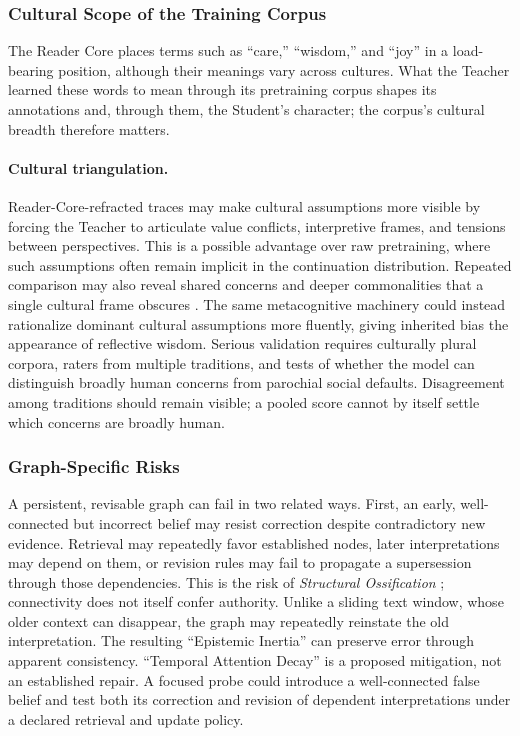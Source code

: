 \documentclass[11pt]{article}
\begin{document}
\subsubsection{Cultural Scope of the Training Corpus}\label{sec:weird-wisdom}

The Reader Core places terms such as ``care,'' ``wisdom,'' and ``joy'' in a load-bearing position, although their meanings vary across cultures. What the Teacher learned these words to mean through its pretraining corpus shapes its annotations and, through them, the Student's character; the corpus's cultural breadth therefore matters.

\paragraph{Cultural triangulation.} Reader-Core-refracted traces may make cultural assumptions more visible by forcing the Teacher to articulate value conflicts, interpretive frames, and tensions between perspectives. This is a possible advantage over raw pretraining, where such assumptions often remain implicit in the continuation distribution. Repeated comparison may also reveal shared concerns and deeper commonalities that a single cultural frame obscures \cite{westerberg2025superintelligence}. The same metacognitive machinery could instead rationalize dominant cultural assumptions more fluently, giving inherited bias the appearance of reflective wisdom. Serious validation requires culturally plural corpora, raters from multiple traditions, and tests of whether the model can distinguish broadly human concerns from parochial social defaults. Disagreement among traditions should remain visible; a pooled score cannot by itself settle which concerns are broadly human.

\subsubsection{Graph-Specific Risks}\label{sec:graph-risks}

A persistent, revisable graph can fail in two related ways. First, an early,
well-connected but incorrect belief may resist correction despite contradictory
new evidence. Retrieval may repeatedly favor established nodes, later
interpretations may depend on them, or revision rules may fail to propagate a
supersession through those dependencies. This is the risk of \emph{Structural
Ossification} \cite{westerberg2026understanding}; connectivity does not itself
confer authority. Unlike a sliding text window, whose older context can
disappear, the graph may repeatedly reinstate the old interpretation. The
resulting ``Epistemic Inertia'' can preserve error through apparent consistency.
``Temporal Attention Decay'' is a proposed mitigation, not an established repair.
A focused probe could introduce a well-connected false belief and test both its
correction and revision of dependent interpretations under a declared retrieval
and update policy.
\end{document}
